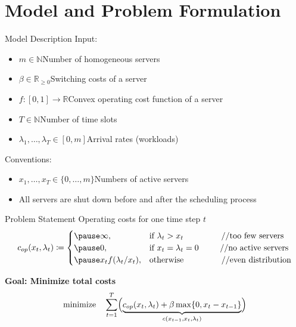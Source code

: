 \documentclass{beamer}
\newcommand{\costs}{c}
\newcommand{\opcosts}{c_{op}}
\newcommand{\fromto}[2]{\{#1,\dotsc,#2\}}
\begin{document}
\section{Model and Problem Formulation}
\begin{frame}{Model Description}
Input:
\begin{itemize}[<+->]
  \item $m\in\mathbb{N}$\dotso Number of homogeneous servers 
  \item $\beta\in\mathbb{R}_{\ge 0}$\dotso Switching costs of a server
  \item $f:[0,1]\rightarrow\mathbb{R}$\dotso Convex operating cost function of a server
  \item $T\in\mathbb{N}$\dotso Number of time slots
  \item $\lambda_1,\dotsc,\lambda_{T}\in[0,m]$\dotso Arrival rates (workloads)
\end{itemize}
\pause[\thebeamerpauses]
Conventions:
\begin{itemize}[<+->]
	\item $x_1,\dotsc,x_{T}\in\fromto{0}{m}$\dotso Numbers of active servers
	\item All servers are shut down before and after the scheduling process
\end{itemize}
\end{frame}
\begin{frame}{Problem Statement}
Operating costs for one time step $t$
\begin{equation*}
	\opcosts(x_t,\lambda_t)\coloneqq\begin{cases}
	  \pause\infty, & \text{if $\lambda_t>x_t$}\hspace{16mm}\text{//too few servers}\\
          \pause 0, & \text{if $x_t=\lambda_t=0$\hspace{9mm}\text{//no active servers}}\\
	  \pause x_tf(\lambda_t/x_t), & \text{otherwise}\hspace{16mm}\text{//even distribution}
	  \end{cases}
\end{equation*}
\pause
\begin{alertbox}
\centering \textbf{Goal: Minimize total costs}
\pause
\begin{align*}
	\text{minimize}\quad \sum\limits_{t=1}^{T}\Bigl(\underbrace{\opcosts(x_t,\lambda_t)+\beta\max\{0,x_t-x_{t-1}\}}_{\costs(x_{t-1},x_t,\lambda_t)}\Bigr)
\end{align*}
\end{alertbox}
\end{frame}
\end{document}
